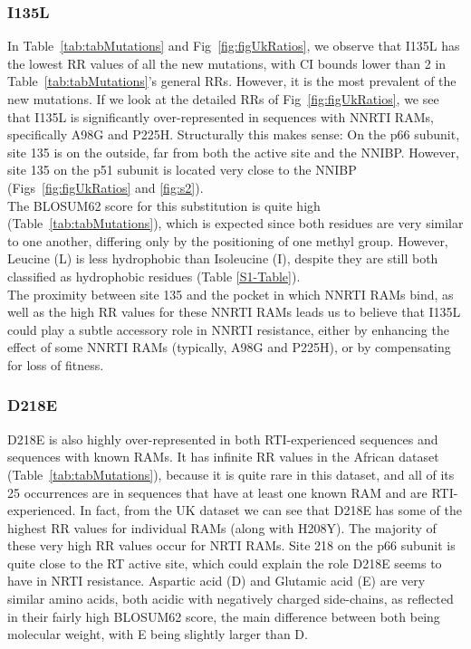 \documentclass[
  11pt,
  twoside]{scrbook}
\begin{document}
\hypertarget{i135l}{%
\subsubsection{I135L}\label{i135l}}

In Table~\ref{tab:tabMutations} and Fig~\ref{fig:figUkRatios},
we observe that I135L has the lowest RR values
of all the new mutations, with CI bounds lower than 2 in
Table~\ref{tab:tabMutations}'s general RRs. However, it is the most
prevalent of the new mutations. If we look at the detailed RRs of
Fig~\ref{fig:figUkRatios}, we
see that I135L is significantly over-represented in sequences with NNRTI
RAMs, specifically A98G and P225H. Structurally this makes sense: On the
p66 subunit, site 135 is on the outside, far from both the active site
and the NNIBP. However, site 135 on the p51 subunit is located very
close to the NNIBP (Figs~\ref{fig:figUkRatios} and \ref{fig:s2}).\\
The BLOSUM62 score for this substitution is quite high
(Table~\ref{tab:tabMutations}), which is expected since both residues are
very similar to one another, differing only by the positioning of one
methyl group. However, Leucine (L) is less hydrophobic than Isoleucine
(I), despite they are still both classified as hydrophobic residues (Table \ref{S1-Table}).\\
The proximity between site 135 and the pocket in which NNRTI RAMs bind,
as well as the high RR values for these NNRTI RAMs leads us to believe
that I135L could play a subtle accessory role in NNRTI resistance,
either by enhancing the effect of some NNRTI RAMs (typically, A98G and
P225H), or by compensating for loss of fitness.

\hypertarget{d218e}{%
\subsubsection{D218E}\label{d218e}}

D218E is also highly over-represented in both RTI-experienced sequences
and sequences with known RAMs. It has infinite RR values in the African
dataset (Table~\ref{tab:tabMutations}), because it is quite rare in this dataset,
and all of its 25 occurrences are in sequences that have at least one
known RAM and are RTI-experienced. In fact, from the UK dataset we can
see that D218E has some of the highest RR values for individual RAMs
(along with H208Y). The majority of these very high RR values occur for
NRTI RAMs. Site 218 on the p66 subunit is quite close to the RT active
site, which could explain the role D218E seems to have in NRTI
resistance. Aspartic acid (D) and Glutamic acid (E) are very similar
amino acids, both acidic with negatively charged side-chains, as
reflected in their fairly high BLOSUM62 score, the main difference
between both being molecular weight, with E being slightly larger than
D.
\end{document}

